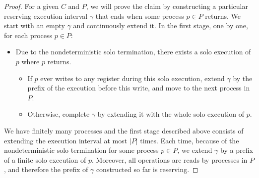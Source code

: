 \begin{proof}
For a given $C$ and $P$, we will prove the claim by constructing a particular reserving execution interval $\gamma$ 
  that ends when some process $p \in P$ returns.
We start with an empty $\gamma$ and continuously extend it.
In the first stage, one by one, for each process $p \in P$: 
\begin{itemize}[noitemsep, nolistsep]
\item Due to the nondeterministic solo termination, there exists a solo execution of $p$ where $p$ returns.
  \begin{itemize}[noitemsep, nolistsep]
  \item If $p$ ever writes to any register during this solo execution, 
    extend $\gamma$ by the prefix of the execution before this write, and move to the next process in $P$.
  \item Otherwise, complete $\gamma$ by extending it with the whole solo execution of $p$.
  \end{itemize}
\end{itemize}
We have finitely many processes and the first stage described above consists of extending the execution interval 
  at most $|P|$ times.
Each time, because of the nondeterministic solo termination for some process $p \in P$, 
  we extend $\gamma$ by a prefix of a finite solo execution of $p$.
Moreover, all operations are reads by processes in $P$, and therefore the prefix of $\gamma$ constructed so far is reserving.


\end{proof}
